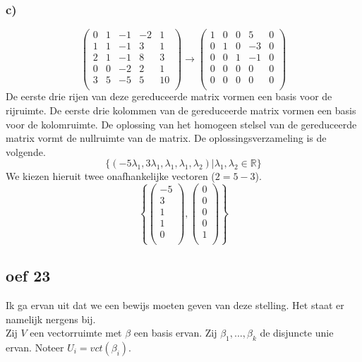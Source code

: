 \documentclass[lineaire_algebra_oplossingen.tex]{subfiles}
\begin{document}
\subsubsection*{c)}
\[
\begin{pmatrix}
0 & 1 & -1 &  -2 & 1 \\
1 & 1 & -1 & 3   & 1 \\
2 & 1 & -1 & 8   & 3 \\
0 & 0 & -2 & 2   & 1 \\
3 & 5 & -5 & 5   & 10\\
\end{pmatrix}
\longrightarrow
\begin{pmatrix}
1 & 0 & 0 & 5 & 0 \\
0 & 1 & 0 & -3& 0 \\
0 & 0 & 1 & -1& 0 \\
0 & 0 & 0 & 0 & 0 \\
0 & 0 & 0 & 0 & 0 \\
\end{pmatrix}
\]
De eerste drie rijen van deze gereduceerde matrix vormen een basis voor de rijruimte.
De eerste drie kolommen van de gereduceerde matrix vormen een basis voor de kolomruimte. 
De oplossing van het homogeen stelsel van de gereduceerde matrix vormt de nullruimte van de matrix.
De oplossingsverzameling is de volgende.
\[
\{(-5\lambda_1,3\lambda_1,\lambda_1,\lambda_1,\lambda_2)|\lambda_1,\lambda_2\in \mathbb{R}\}
\]
We kiezen hieruit twee onafhankelijke vectoren ($2=5-3$).
\[
\left\lbrace
\begin{pmatrix}
-5\\3\\1\\1\\0\\
\end{pmatrix}
,
\begin{pmatrix}
0\\0\\0\\0\\1\\
\end{pmatrix}
\right\rbrace
\]

\subsection{oef 23}
Ik ga ervan uit dat we een bewijs moeten geven van deze stelling. Het staat er namelijk nergens bij.\\
Zij $V$ een vectorruimte met $\beta$ een basis ervan. Zij $\beta_1,...,\beta_k$ de disjuncte unie ervan. Noteer $U_i=vct(\beta_i)$.
\end{document}

